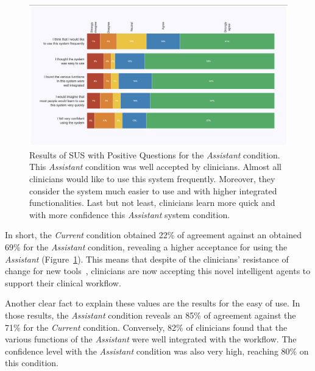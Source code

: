 \begin{figure}[htbp]
\centering
\includegraphics[width=\textwidth]{images/fig034}
\caption{Results of SUS with Positive Questions for the {\it Assistant} condition. This {\it Assistant} condition was well accepted by clinicians. Almost all clinicians would like to use this system frequently. Moreover, they consider the system much easier to use and with higher integrated functionalities. Last but not least, clinicians learn more quick and with more confidence this {\it Assistant} system condition.}
\label{fig:fig034}
\end{figure}

In short, the {\it Current} condition obtained 22\% of agreement against an obtained 69\% for the {\it Assistant} condition, revealing a higher acceptance for using the {\it Assistant} (Figure~\ref{fig:fig034}).
This means that despite of the clinicians' resistance of change for new tools~\cite{10.1145/3132272.3134111, gagnon2014electronic}, clinicians are now accepting this novel intelligent agents to support their clinical workflow.

Another clear fact to explain these values are the results for the easy of use.
In those results, the {\it Assistant} condition reveals an 85\% of agreement against the 71\% for the {\it Current} condition.
Conversely, 82\% of clinicians found that the various functions of the {\it Assistant} were well integrated with the workflow.
The confidence level with the {\it Assistant} condition was also very high, reaching 80\% on this condition.

